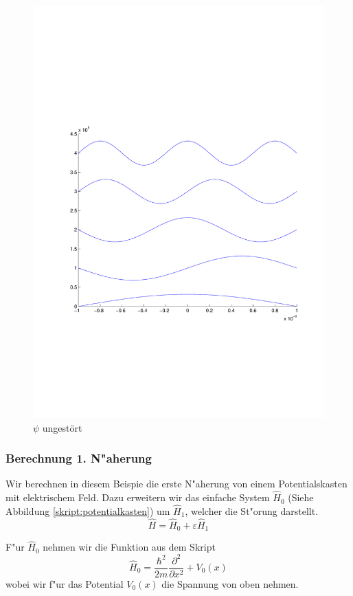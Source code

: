 \begin{refsection}
\begin{figure}
 \centering
 \includegraphics[width=12cm,clip=true,trim=2cm 7cm 1cm 8cm]{efeld/Psi_ungestoert.pdf}
 \caption{$\psi$ ungest\"ort}
 \label{abb:efeld_psi_ungestoert}
\end{figure}








\subsubsection{Berechnung 1. N"aherung}


Wir berechnen in diesem Beispie die erste N"aherung von einem Potentialskasten mit elektrischem Feld.
Dazu erweitern wir das einfache System  $\hat H_0$
(Siehe Abbildung \ref{skript:potentialkasten})
um $\hat H_1$, welcher die St"orung darstellt.
\[
  \hat{H} = \hat H_0 + \varepsilon \hat H_1
\]

F"ur $\hat H_0$ nehmen wir die Funktion aus dem Skript
\[
  \hat H_0 = \frac{\hbar^2}{2m} \frac{\partial^2}{\partial x^2} + V_0(x)
\]
wobei wir f"ur das Potential $V_0(x)$ die Spannung von oben nehmen.


\end{refsection}
